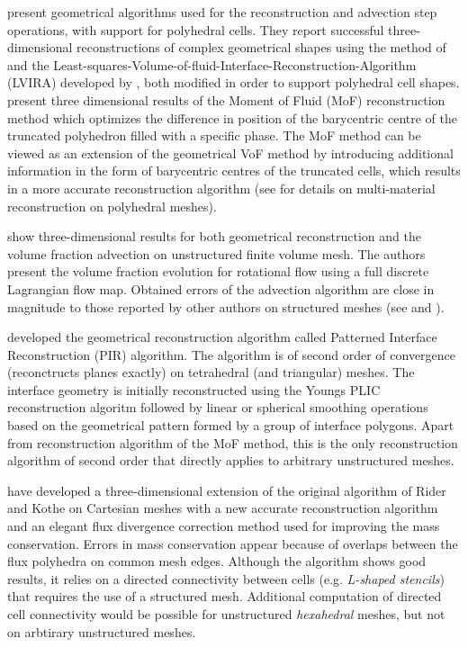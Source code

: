 \citet{AhnShashkovGeometricAlg2008} present geometrical algorithms used for the
reconstruction and advection step operations, with support for polyhedral
cells. They report successful three-dimensional reconstructions of complex
geometrical shapes using the method of \citet{ParkerYoungsGradient} and the
Least-squares-Volume-of-fluid-Interface-Reconstruction-Algorithm (LVIRA)
developed by \citet{PuckettLvira1991}, both modified in order to support
polyhedral cell shapes. \citet{ShashkovDyadechkoMoF2005} present three
dimensional results of the Moment of Fluid (MoF) reconstruction method which
optimizes the difference in position of the barycentric centre of the truncated
polyhedron filled with a specific phase. The MoF method can be viewed as an
extension of the geometrical VoF method by introducing additional information
in the form of barycentric centres of the truncated cells, which results in a
more accurate reconstruction algorithm (see
\citet{AhnShashkovMultiMaterialRec2007} for details on multi-material
reconstruction on polyhedral meshes). 

\citet{jofreUnstructuredPLIC} show three-dimensional results for both
geometrical reconstruction and the volume fraction advection on unstructured
finite volume mesh. The authors present the volume fraction evolution for
rotational flow using a full discrete Lagrangian flow map. Obtained errors of
the advection algorithm are close in magnitude to those reported by other
authors on structured meshes (see \citet{LiovicCVTNA2006} and
\citet{HernandezLopezPart1Advection2008}). 

\citet{MossoPIR2009} developed the geometrical reconstruction algorithm called
Patterned Interface Reconstruction (PIR) algorithm. The algorithm is of second
order of convergence (reconctructs planes exactly) on tetrahedral (and
triangular) meshes. The interface geometry is initially reconstructed using the
Youngs PLIC reconstruction algoritm followed by linear or spherical smoothing
operations based on the geometrical pattern formed by a group of interface
polygons. Apart from reconstruction algorithm of the MoF method, this is the
only reconstruction algorithm of second order that directly applies to 
arbitrary unstructured meshes. 

\citet{LiovicCVTNA2006} have developed a three-dimensional extension of the
original algorithm of Rider and Kothe on Cartesian meshes with a new accurate
reconstruction algorithm and an elegant flux divergence correction method used
for improving the mass conservation. Errors in mass conservation appear because
of overlaps between the flux polyhedra on common mesh edges. Although the
algorithm shows good results, it relies on a directed connectivity between
cells (e.g. \emph{L-shaped stencils}) that requires the use of a structured
mesh. Additional computation of directed cell connectivity would be
possible for unstructured \emph{hexahedral} meshes, but not on arbtirary
unstructured meshes.


